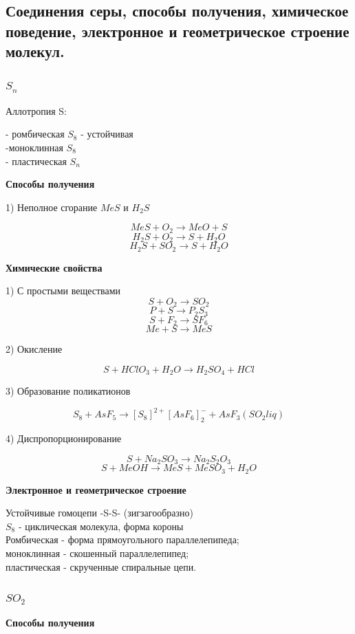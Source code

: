 
\subsection{Соединения серы, способы получения, химическое поведение, электронное и геометрическое строение молекул.}

\subsubsection*{$S_n$}

Аллотропия S:

- ромбическая $S_8$ - устойчивая\\
-моноклинная $S_8$\\
- пластическая $S_n$

\textbf{Способы получения}

1) Неполное сгорание $MeS$ и $H_2S$

$$MeS + O_2 \rightarrow MeO + S$$
$$H_2S + O_2 \rightarrow S + H_2O$$
$$H_2S + SO_2 \rightarrow S + H_2O$$

\textbf{Химические свойства}

1) С простыми веществами
$$S + O_2 \rightarrow SO_2$$
$$P + S \rightarrow P_2S_3$$
$$S+F_2 \rightarrow SF_6$$
$$Me + S \rightarrow MeS$$

2) Окисление

$$S + HClO_3 + H_2O \rightarrow H_2SO_4 + HCl$$

3) Образование поликатионов

$$S_8 + AsF_5 \rightarrow [S_8]^{2+}[AsF_6]_2^- + AsF_3(SO_2 liq)$$

4) Диспропорционирование

$$S + Na_2SO_3 \rightarrow Na_2S_2O_3$$
$$S + MeOH \rightarrow MeS + MeSO_3 + H_2O$$

\textbf{Электронное и геометрическое строение}

Устойчивые гомоцепи -S-S- (зигзагообразно)\\
$S_8$ - циклическая молекула, форма короны\\
Ромбическая - форма прямоугольного параллелепипеда;\\
моноклинная - скошенный параллелепипед;\\
пластическая - скрученные спиральные цепи.

\subsubsection*{$SO_2$}

\textbf{Способы получения}

